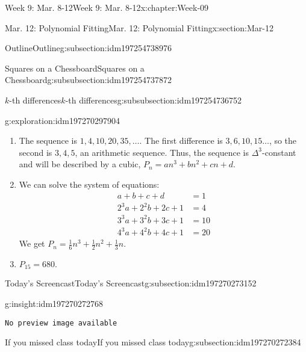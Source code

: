 \documentclass[oneside,10pt,]{book}
\newcommand{\mono}[1]{\texttt{#1}}
\numberwithin{equation}{section}
\newlength{\qrsize}
\newlength{\previewwidth}
\newcommand{\amp}{&}
\begin{document}
\begin{chapterptx}{Week 9: Mar. 8-12}{}{Week 9: Mar. 8-12}{}{}{x:chapter:Week-09}
\begin{sectionptx}{Mar. 12: Polynomial Fitting}{}{Mar. 12: Polynomial Fitting}{}{}{x:section:Mar-12}
\begin{subsectionptx}{Outline}{}{Outline}{}{}{g:subsection:idm197254738976}
\begin{subsubsectionptx}{Squares on a Chessboard}{}{Squares on a Chessboard}{}{}{g:subsubsection:idm197254737872}
\begin{subsubsectionptx}{\(k\)-th differences}{}{\(k\)-th differences}{}{}{g:subsubsection:idm197254736752}
\begin{exploration}{}{g:exploration:idm197270297904}
\begin{enumerate}
\item{}The sequence is \(1, 4, 10, 20, 35, \ldots\). The first difference is \(3, 6, 10, 15\ldots\), so the second is \(3, 4, 5\), an arithmetic sequence. Thus, the sequence is \(\Delta^3\)-constant and will be described by a cubic, \(P_n = a n^3 + b n^2 + cn + d\).%
\item{}We can solve the system of equations:%
%
\begin{align*}
a + b + c + d \amp= 1\\
2^3 a + 2^2 b + 2c + 1 \amp=4\\
3^3 a + 3^2 b + 3c + 1 \amp=10\\
4^3 a + 4^2 b + 4c + 1 \amp=20
\end{align*}
We get \(P_n = \frac{1}{6}n^3 + \frac{1}{2}n^2 + \frac{1}{3}n\).%
\item{}\(\displaystyle P_{15} = 680.\)%
\end{enumerate}
\end{exploration}%
\end{subsubsectionptx}
\end{subsubsectionptx}
\end{subsectionptx}
%
%
\typeout{************************************************}
\typeout{************************************************}
%
\begin{subsectionptx}{Today's Screencast}{}{Today's Screencast}{}{}{g:subsection:idm197270273152}
\begin{insight}{}{g:insight:idm197270272768}%
\setlength{\qrsize}{9em}
\setlength{\previewwidth}{\linewidth}
\addtolength{\previewwidth}{-\qrsize}
\begin{tcbraster}[raster columns=2, raster column skip=1pt, raster halign=center, raster force size=false, raster left skip=0pt, raster right skip=0pt]%
\begin{tcolorbox}[previewstyle, width=\previewwidth]%
\mono{No preview image available}%
\end{tcolorbox}%
\begin{tcolorbox}[qrstyle]%
[QR LINK]\end{tcolorbox}%
\end{tcbraster}%
\end{insight}
\end{subsectionptx}
%
%
\typeout{************************************************}
\typeout{************************************************}
%
\begin{subsectionptx}{If you missed class today}{}{If you missed class today}{}{}{g:subsection:idm197270272384}

\end{subsectionptx}
\end{sectionptx}
\end{chapterptx}
\end{document}
